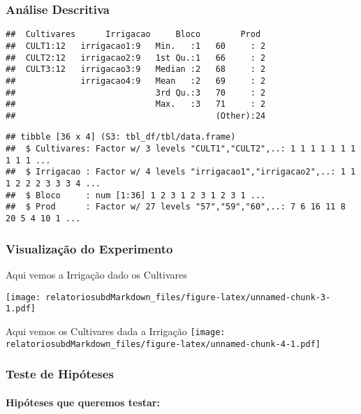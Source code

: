 \documentclass[
]{article}
\begin{document}
\hypertarget{anuxe1lise-descritiva}{%
\subsubsection{Análise Descritiva}\label{anuxe1lise-descritiva}}

\begin{verbatim}
##  Cultivares      Irrigacao     Bloco        Prod   
##  CULT1:12   irrigacao1:9   Min.   :1   60     : 2  
##  CULT2:12   irrigacao2:9   1st Qu.:1   66     : 2  
##  CULT3:12   irrigacao3:9   Median :2   68     : 2  
##             irrigacao4:9   Mean   :2   69     : 2  
##                            3rd Qu.:3   70     : 2  
##                            Max.   :3   71     : 2  
##                                        (Other):24
\end{verbatim}

\begin{verbatim}
## tibble [36 x 4] (S3: tbl_df/tbl/data.frame)
##  $ Cultivares: Factor w/ 3 levels "CULT1","CULT2",..: 1 1 1 1 1 1 1 1 1 1 ...
##  $ Irrigacao : Factor w/ 4 levels "irrigacao1","irrigacao2",..: 1 1 1 2 2 2 3 3 3 4 ...
##  $ Bloco     : num [1:36] 1 2 3 1 2 3 1 2 3 1 ...
##  $ Prod      : Factor w/ 27 levels "57","59","60",..: 7 6 16 11 8 20 5 4 10 1 ...
\end{verbatim}

\hypertarget{visualizauxe7uxe3o-do-experimento}{%
\subsubsection{Visualização do
Experimento}\label{visualizauxe7uxe3o-do-experimento}}

Aqui vemos a Irrigação dado os Cultivares

\texttt{[image: relatoriosubdMarkdown\_files/figure-latex/unnamed-chunk-3-1.pdf]}

Aqui vemos os Cultivares dada a Irrigação
\texttt{[image: relatoriosubdMarkdown\_files/figure-latex/unnamed-chunk-4-1.pdf]}

\hypertarget{teste-de-hipuxf3teses}{%
\subsubsection{Teste de Hipóteses}\label{teste-de-hipuxf3teses}}

\hypertarget{hipuxf3teses-que-queremos-testar}{%
\paragraph{Hipóteses que queremos
testar:}\label{hipuxf3teses-que-queremos-testar}}
\end{document}
